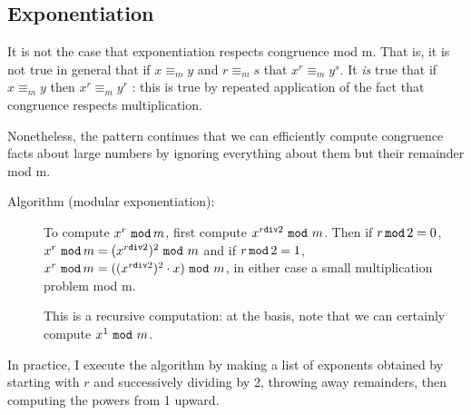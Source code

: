 \documentclass[12pt]{article}
\begin{document}
\subsection{Exponentiation}

It is not the case that exponentiation respects congruence mod m.  That is, it is not true in general that if $x \equiv_m y$ and
$r \equiv_m s$ that $x^r \equiv_m y^s$.  It {\em is} true that if $x \equiv_m y$ then $x^r \equiv_m y^r$ :  this is true by repeated application of the fact that congruence respects multiplication.

Nonetheless, the pattern continues that we can efficiently compute congruence facts about large numbers by ignoring everything about them but their remainder mod m.

\begin{description}

\item[Algorithm (modular exponentiation):]  To compute $x^r\,\,{\tt mod}\, m$, first compute $x^{r {\tt div} 2}\,\,{\tt mod}\,\,m$.  Then
if $r \,{\tt mod}\,2=0$, $x^r\,\,{\tt mod}\, m = (x^{r {\tt div} 2})^2\,\,{\tt mod}\,\,m$ and if $r \,{\tt mod}\,2=1$, $x^r\,\,{\tt mod}\, m = ((x^{r {\tt div} 2})^2\cdot x)\,\,{\tt mod}\,\,m$, in either case a small multiplication problem mod m.

This is a recursive computation:  at the basis, note that we can certainly compute $x^1 \,\,{\tt mod}\,\, m$.

\end{description}

In practice, I execute the algorithm by making a list of exponents obtained by starting with $r$ and successively dividing by 2, throwing away remainders, then computing the powers from 1 upward.
\end{document}

